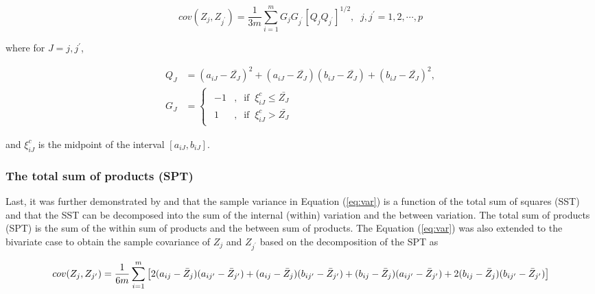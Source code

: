 \documentclass[article]{jss}
\begin{document}
\begin{CodeChunk}
\begin{equation}\label{eq:gq_cov}
cov(Z_j,Z_{j^{ \prime}}) = \frac{1}{3m}\sum_{i=1}^{m}G_jG_{j^{\prime}}\left[ Q_jQ_{j^\prime} \right]^{1/2}, \;\;j,j^\prime=1,2,\cdots,p
\end{equation}

where for $J = j,j^\prime$, 

\[
\begin{split}
Q_J &= (a_{iJ} - \bar{Z_J})^2 +(a_{iJ} - \bar{Z_J})(b_{iJ} - \bar{Z_J})+(b_{iJ} - \bar{Z_J})^2,\\
G_J &= \left\{\begin{array}{l}
          \begin{split}
          -1 &, \;\;\mbox{if} \;\; \xi_{iJ}^{c} \leq \bar{Z_J}\\
           1 &,  \;\;\mbox{if} \;\;  \xi_{iJ}^{c} > \bar{Z_J}
           \end{split}
        \end{array}\right.
\end{split}
\]

and $\xi_{iJ}^{c}$ is the midpoint of the interval $[a_{iJ},b_{iJ}]$.




\subsubsection{The total sum of products (SPT)}
Last, it was further demonstrated by \cite{billard:2007} and \cite{billard:2008} that the sample variance in Equation (\ref{eq:var})
is a function of the total sum of squares (SST) and that the SST can be decomposed into the sum of the internal (within) variation and the between variation. The total sum of products (SPT) is the sum of the within sum of products and the between sum of products. The Equation (\ref{eq:var}) was also extended to the bivariate case to obtain the sample covariance of $Z_j$ and $Z_{j^\prime}$ based on the decomposition of the SPT as

\begin{equation}\label{eq:spt_cov}
cov(Z_j,Z_{j^{ \prime}}) = \frac{1}{6m}\sum_{i = 1}^m \left[ 2(a_{ij}-\bar{Z}_j)(a_{ij^\prime}-\bar{Z}_{j^\prime}) +(a_{ij}-\bar{Z}_j)(b_{ij^\prime}-\bar{Z}_{j^\prime})\\
+(b_{ij}-\bar{Z}_j)(a_{ij^\prime}-\bar{Z}_{j^\prime})+2(b_{ij}-\bar{Z}_j)(b_{ij^\prime}-\bar{Z}_{j^\prime})\right]
\end{equation}


\end{CodeChunk}
\end{document}
